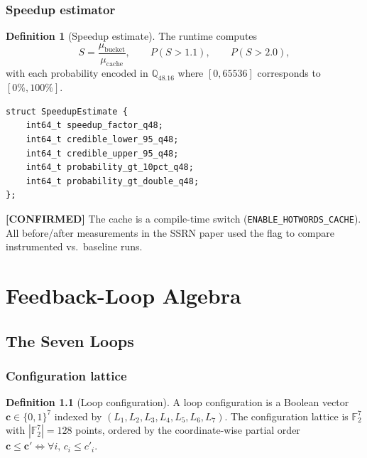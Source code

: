 \documentclass[11pt,letterpaper,openany]{book}
\theoremstyle{definition}
\newtheorem{definition}{Definition}[chapter]
\theoremstyle{plain}
\newcommand{\confirmed}{\textcolor{green!50!black}{\textbf{[CONFIRMED]}}\xspace}
\newcommand{\Qfp}{\mathbb{Q}_{48.16}}                %
\newcommand{\Loop}[1]{L_{#1}}
\begin{document}
\section{Speedup estimator}

\begin{definition}[Speedup estimate]\label{def:speedup}
The runtime computes
\[
  S = \frac{\mu_{\mathrm{bucket}}}{\mu_{\mathrm{cache}}},\qquad
  P(S>1.1),\qquad P(S>2.0),
\]
with each probability encoded in $\Qfp$ where $[0, 65536]$ corresponds to
$[0\%, 100\%]$.
\end{definition}

\begin{lstlisting}[caption={Speedup estimate record
  (\texttt{include/physics\_hotwords\_cache.h}:276--282).}]
struct SpeedupEstimate {
    int64_t speedup_factor_q48;
    int64_t credible_lower_95_q48;
    int64_t credible_upper_95_q48;
    int64_t probability_gt_10pct_q48;
    int64_t probability_gt_double_q48;
};
\end{lstlisting}

\confirmed The cache is a compile-time switch
(\texttt{ENABLE\_HOTWORDS\_CACHE}). All before/after measurements in the
SSRN paper used the flag to compare instrumented vs.\ baseline runs.

\part{Feedback-Loop Algebra}

\chapter{The Seven Loops}
\label{ch:loops}

\section{Configuration lattice}

\begin{definition}[Loop configuration]\label{def:config}
A loop configuration is a Boolean vector $\mathbf{c}\in\{0,1\}^7$ indexed
by $(\Loop{1},\Loop{2},\Loop{3},\Loop{4},\Loop{5},\Loop{6},\Loop{7})$.
The configuration lattice is $\mathbb{F}_2^7$ with $|\mathbb{F}_2^7| = 128$
points, ordered by the coordinate-wise partial order
$\mathbf{c}\le \mathbf{c}'\iff \forall i,\,c_i\le c'_i$.
\end{definition}
\end{document}
